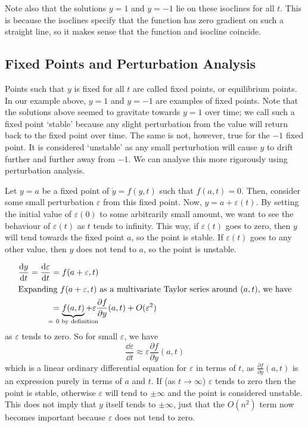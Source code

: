 \documentclass{article}
\begin{document}
Note also that the solutions $y = 1$ and $y = -1$ lie on these isoclines for all $t$. This is because the isoclines specify that the function has zero gradient on such a straight line, so it makes sense that the function and isocline coincide.

\subsection{Fixed Points and Perturbation Analysis}
Points such that $y$ is fixed for all $t$ are called fixed points, or equilibrium points. In our example above, $y=1$ and $y=-1$ are examples of fixed points. Note that the solutions above seemed to gravitate towards $y=1$ over time; we call such a fixed point `stable' because any slight perturbation from the value will return back to the fixed point over time. The same is not, however, true for the $-1$ fixed point. It is considered `unstable' as any small perturbation will cause $y$ to drift further and further away from $-1$. We can analyse this more rigorously using perturbation analysis.

Let $y = a$ be a fixed point of $\dot y = f(y, t)$ such that $f(a, t) = 0$. Then, consider some small perturbation $\varepsilon$ from this fixed point. Now, $y = a + \varepsilon(t)$. By setting the initial value of $\varepsilon(0)$ to some arbitrarily small amount, we want to see the behaviour of $\varepsilon(t)$ as $t$ tends to infinity. This way, if $\varepsilon(t)$ goes to zero, then $y$ will tend towards the fixed point $a$, so the point is stable. If $\varepsilon(t)$ goes to any other value, then $y$ does not tend to $a$, so the point is unstable.

\begin{align*}
	\frac{\dd y}{\dd t} = \frac{\dd \varepsilon}{\dd t} & = f(a + \varepsilon, t)                                                                                                            \\
	\intertext{Expanding $f(a + \varepsilon, t)$ as a multivariate Taylor series around $(a, t)$, we have}
	                                                    & = \underbrace{f(a, t)}_{\mathclap{=\ 0\text{ by definition}}} + \varepsilon \frac{\partial f}{\partial y}(a, t) + O(\varepsilon^2)
\end{align*}
as $\varepsilon$ tends to zero. So for small $\varepsilon$, we have
\[ \frac{\dd \varepsilon}{\dd t} \approx \varepsilon \frac{\partial f}{\partial y}(a, t) \]
which is a linear ordinary differential equation for $\varepsilon$ in terms of $t$, as $\frac{\partial f}{\partial y}(a, t)$ is an expression purely in terms of $a$ and $t$. If (as $t \to \infty$) $\varepsilon$ tends to zero then the point is stable, otherwise $\varepsilon$ will tend to $\pm \infty$ and the point is considered unstable. This does not imply that $y$ itself tends to $\pm \infty$, just that the $O(n^2)$ term now becomes important because $\varepsilon$ does not tend to zero.
\end{document}
